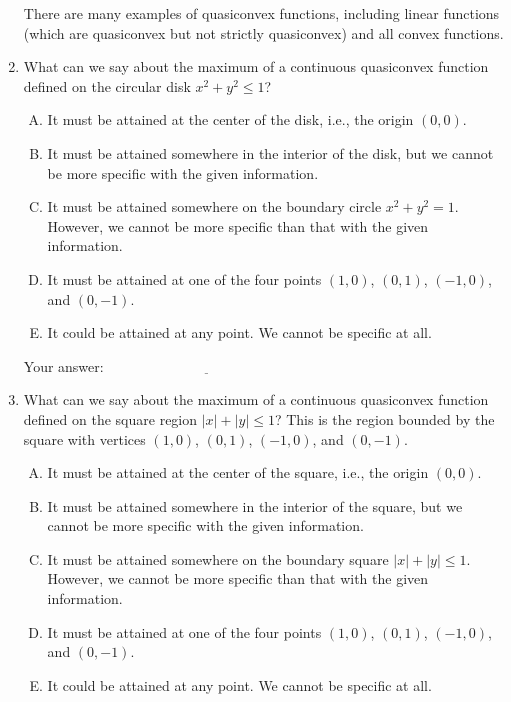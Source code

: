 \documentclass[10pt]{amsart}
\begin{document}
\begin{enumerate}
  There are many examples of quasiconvex functions, including linear
  functions (which are quasiconvex but not strictly quasiconvex)
  and all convex functions.

\item What can we say about the maximum of a continuous quasiconvex
  function defined on the circular disk $x^2 + y^2 \le 1$?

  \begin{enumerate}[(A)]
  \item It must be attained at the center of the disk, i.e., the
    origin $(0,0)$.
  \item It must be attained somewhere in the interior of the disk, but
    we cannot be more specific with the given information.
  \item It must be attained somewhere on the boundary circle $x^2 +
    y^2 = 1$. However, we cannot be more specific than that with the
    given information.
  \item It must be attained at one of the four points $(1,0)$,
    $(0,1)$, $(-1,0)$, and $(0,-1)$. 
  \item It could be attained at any point. We cannot be specific at all.
  \end{enumerate}

  \vspace{0.1in}
  Your answer: $\underline{\qquad\qquad\qquad\qquad\qquad\qquad\qquad}$
  \vspace{0.15in}


\item What can we say about the maximum of a continuous quasiconvex
  function defined on the square region $|x| + |y|\le 1$? This is the
  region bounded by the square with vertices $(1,0)$, $(0,1)$,
  $(-1,0)$, and $(0,-1)$.

  \begin{enumerate}[(A)]
  \item It must be attained at the center of the square, i.e., the
    origin $(0,0)$.
  \item It must be attained somewhere in the interior of the square, but
    we cannot be more specific with the given information.
  \item It must be attained somewhere on the boundary square $|x| +
    |y| \le 1$. However, we cannot be more specific than that with the
    given information.
  \item It must be attained at one of the four points $(1,0)$,
    $(0,1)$, $(-1,0)$, and $(0,-1)$. 
  \item It could be attained at any point. We cannot be specific at all.
  \end{enumerate}


\end{enumerate}
\end{document}
